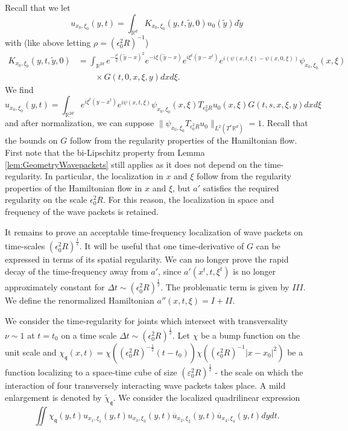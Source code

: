 \documentclass{amsart}
\theoremstyle{definition}
\newcommand{\R}{\mathbb{R}}
\begin{document}
Recall that we let
\begin{equation*}
u_{x_0,\xi_0}(y,t) = \int_{\R^d} K_{x_0,\xi_0}(y,t,\tilde{y},0) u_0(\tilde{y}) d\tilde{y}
\end{equation*}
with (like above letting $\rho = (\epsilon_0^2 R)^{-1}$)
\begin{equation*}
\begin{split}
K_{x_0,\xi_0}(y,t,\tilde{y},0) &= \int_{\R^{2d}} e^{- \frac{\rho}{2}(\tilde{y}-x)^2} e^{-i \xi (\tilde{y}-x)} e^{i \xi^t (y-x^t)} e^{i (\psi(x,t,\xi) - \psi(x,0,\xi))} \psi_{x_0,\xi_0}(x,\xi) \\
&\quad \quad \times G(t,0,x,\xi,y) dx d\xi.
\end{split}
\end{equation*}
We find
\begin{equation*}
u_{x_0,\xi_0}(y,t) = \int_{\R^{2d}} e^{i \xi^t (y-x^t)} e^{i \psi(x,t,\xi) } \psi_{x_0,\xi_0}(x,\xi) T_{\epsilon_0^2 R} u_0(x,\xi) G(t,s,x,\xi,y) dx d\xi
\end{equation*}
and after normalization, we can suppose $\| \psi_{x_0,\xi_0} T_{\epsilon_0^2 R} u_0 \|_{L^2(T^* \R^d)} = 1$.
Recall that the bounds on $G$ follow from the regularity properties of the Hamiltonian flow. 
First note that the bi-Lipschitz property from Lemma \ref{lem:GeometryWavepackets} still applies as it does not depend on the time-regularity.
 In particular, the localization in $x$ and $\xi$ follow from the regularity properties of the Hamiltonian flow in $x$ and $\xi$, but $a'$ satisfies the required regularity on the scale $\epsilon_0^2 R$. For this reason, the localization in space and frequency of the wave packets is retained.

It remains to prove an acceptable time-frequency localization of wave packets on time-scales $(\epsilon_0^2 R)^{\frac{1}{2}}$. It will be useful that one time-derivative of $G$ can be expressed in terms of its spatial regularity. We can no longer prove the rapid decay of the time-frequency away from $a'$, since $a'(x^t,t,\xi^t)$ is no longer approximately constant for $\Delta t \sim (\epsilon_0^2 R)^{\frac{1}{2}}$. The problematic term is given by $III$. We define the renormalized Hamiltonian $a''(x,t,\xi) = I + II$.

 We consider the time-regularity for joints which intersect with transversality $\nu \sim 1$ at $t=t_0$ on a time scale $\Delta t \sim (\epsilon_0^2 R)^{\frac{1}{2}}$. Let $\chi$ be a bump function on the unit scale and $\chi_{\mathfrak{q}}(x,t) = \chi((\epsilon_0^2 R)^{-\frac{1}{2}}(t-t_0)) \chi( (\epsilon_0^2 R)^{-1} | x-x_0|^2)$ be a function localizing to a space-time cube of size $(\varepsilon_0^2 R)^{\frac{1}{2}}$ - the scale on which the interaction of four transversely interacting wave packets takes place. A mild enlargement is denoted by $\tilde{\chi}_{\mathfrak{q}}$. We consider the localized quadrilinear expression
\begin{equation}\label{quad}
\iint \chi_{\mathfrak{q}}(y,t) u_{x_1,\xi_1}(y,t) u_{x_3,\xi_3}(y,t) \overline{u}_{x_2,\xi_2}(y,t) \overline{u}_{x_4,\xi_4}(y,t) dy dt.
\end{equation}
\end{document}
